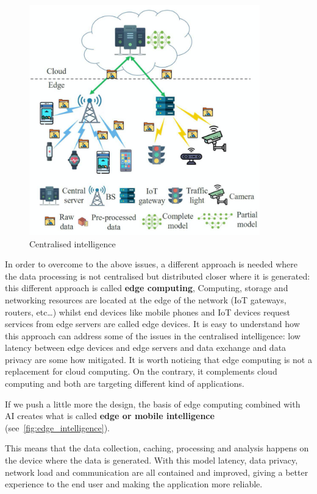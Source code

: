 \begin{figure}[ht]
    \includegraphics[width=10cm]{images/introduction/centralised_intelligence.png}
    \centering
    \caption{Centralised intelligence}\label{fig:centralised_intelligence}
\end{figure}

In order to overcome to the above issues, a different approach is needed where
the data processing is not centralised but distributed closer where it is
generated: this different approach is called \textbf{edge computing},
Computing, storage and networking resources are located at the edge of the
network (IoT gateways, routers, etc\ldots) whilst end devices like mobile
phones and IoT devices request services from edge servers are called edge
devices.
It is easy to understand how this approach can address some of the issues in
the centralised intelligence: low latency between edge devices and edge servers
and data exchange and data privacy are some how mitigated.
It is worth noticing that edge computing is not a replacement for cloud
computing. On the contrary, it complements cloud computing and both are
targeting different kind of applications.

If we push a little more the design, the basis of edge computing combined with
AI creates what is called
\textbf{edge or mobile intelligence} (see~\ref{fig:edge_intelligence}).

This means that the data collection, caching, processing and analysis happens
on the device where the data is generated.
With this model latency, data privacy, network load and communication are all
contained and improved, giving a better experience to the end user and making
the application more reliable.

